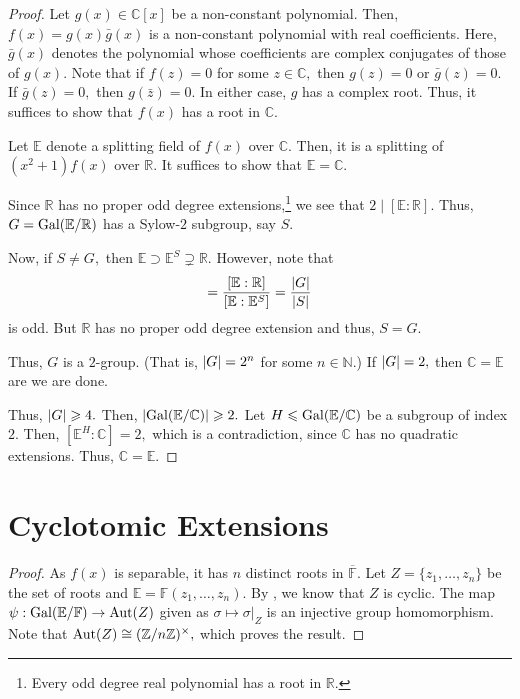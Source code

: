 \ftagalois*\label{thm:ftagalois2}
\begin{flushright}\hyperref[thm:ftagalois]{\upsym}\end{flushright}
\begin{proof}
    Let $g(x) \in \mathbb{C}[x]$ be a non-constant polynomial. Then, $f(x) = g(x)\bar{g}(x)$ is a non-constant polynomial with real coefficients. Here, $\bar{g}(x)$ denotes the polynomial whose coefficients are complex conjugates of those of $g(x).$ Note that if $f(z) = 0$ for some $z \in \mathbb{C},$ then $g(z) = 0$ or $\bar{g}(z) = 0.$ If $\bar{g}(z) = 0,$ then $g(\bar{z}) = 0.$ In either case, $g$ has a complex root. Thus, it suffices to show that $f(x)$ has a root in $\mathbb{C}.$

    Let $\mathbb{E}$ denote a splitting field of $f(x)$ over $\mathbb{C}.$ Then, it is a splitting of $(x^2 + 1)f(x)$ over $\mathbb{R}.$ It suffices to show that $\mathbb{E} = \mathbb{C}.$ 

    Since $\mathbb{R}$ has no proper odd degree extensions,\footnote{Every odd degree real polynomial has a root in $\mathbb{R}.$} we see that $2 \mid [\mathbb{E} : \mathbb{R}].$ Thus, $G = \operatorname{Gal}(\mathbb{E}/\mathbb{R})$ has a Sylow-$2$ subgroup, say $S.$

    Now, if $S \neq G,$ then $\mathbb{E} \supset \mathbb{E}^S \supsetneq \mathbb{R}.$ However, note that 
    \begin{equation*} 
        [\mathbb{E}^S : \mathbb{R}] = \frac{[\mathbb{E} : \mathbb{R}]}{[\mathbb{E} : \mathbb{E}^S]} = \frac{\md{G}}{\md{S}}
    \end{equation*} 
    is odd. But $\mathbb{R}$ has no proper odd degree extension and thus, $S = G.$

    Thus, $G$ is a $2$-group. (That is, ${\left\lvert G \right\lvert} = 2^n$ for some $n \in \mathbb{N}.$) If ${\left\lvert G \right\lvert} = 2,$ then $\mathbb{C} = \mathbb{E}$ are we are done.

    Thus, ${\left\lvert G \right\lvert} \geqslant 4.$ Then, ${\left\lvert \operatorname{Gal}(\mathbb{E}/\mathbb{C}) \right\lvert} \geqslant 2.$ Let $H \leqslant \operatorname{Gal}(\mathbb{E}/\mathbb{C})$ be a subgroup of index $2.$ Then, $[\mathbb{E}^H : \mathbb{C}] = 2,$ which is a contradiction, since $\mathbb{C}$ has no quadratic extensions. Thus, $\mathbb{C} = \mathbb{E}.$ 
\end{proof}

\section{Cyclotomic Extensions}
\Gfabeliansubgroup*\label{prop:Gfabeliansubgroup2}
\begin{flushright}\hyperref[prop:Gfabeliansubgroup]{\upsym}\end{flushright}
\begin{proof}
    As $f(x)$ is separable, it has $n$ distinct roots in $\overline{\mathbb{F}}.$ Let $Z = \{z_1, \ldots, z_n\}$ be the set of roots and $\mathbb{E} = \mathbb{F}(z_1, \ldots, z_n).$ By , we know that $Z$ is cyclic. The map $\psi : \operatorname{Gal}(\mathbb{E}/\mathbb{F}) \to \operatorname{Aut}(Z)$ given as $\sigma \mapsto \sigma|_Z$ is an injective group homomorphism. Note that $\operatorname{Aut}(Z) \cong (\mathbb{Z}/n\mathbb{Z})^\times,$ which proves the result.
\end{proof}

